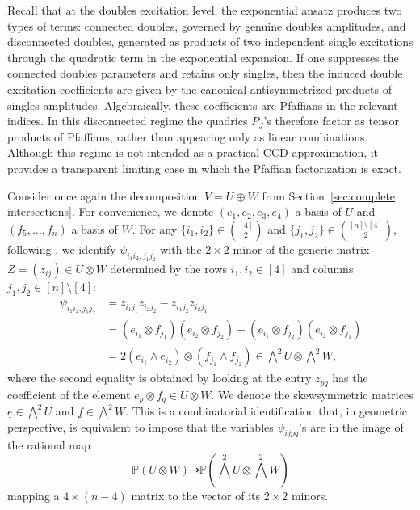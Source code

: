 \documentclass[11pt,reqno]{amsart}
\theoremstyle{definition}
\numberwithin{theorem}{section}
\numberwithin{equation}{section}
\begin{document}
Recall that at the doubles excitation level, the exponential ansatz produces two types of terms: connected doubles, governed by genuine doubles amplitudes, and disconnected doubles, generated as products of two independent single excitations through the quadratic term in the exponential expansion. If one suppresses the connected doubles parameters and retains only singles, then the induced double excitation coefficients are given by the canonical antisymmetrized products of singles amplitudes. Algebraically, these coefficients are Pfaffians in the relevant indices. In this disconnected regime the quadrics $P_J$'s therefore factor as tensor products of Pfaffians, rather than appearing only as linear combinations. Although this regime is not intended as a practical CCD approximation, it provides a transparent limiting case in which the Pfaffian factorization is exact.

Consider once again the decomposition $V = U \oplus W$ from Section~\ref{sec:complete intersections}. For convenience, we denote $(e_1,e_2,e_3, e_4)$ a basis of $U$ and $(f_5,\ldots , f_n)$ a basis of $W$.
\noindent For any $\{i_1,i_2\}\in \binom{[4]}{2}$ and $\{j_1,j_2\}\in \binom{[n]\setminus [4]}{2}$, following \cite[Sec.\ 2.7.2]{landsberg2011tensors}, we identify $\psi_{i_1i_2,j_1j_2}$ with the $2\times 2$ minor of the generic matrix $Z=(z_{ij}) \in U\otimes W$ determined by the rows $i_1,i_2\in [4]$ and columns $j_1,j_2\in [n]\setminus [4]$:
\begin{align}\label{eq:t's as minors}
\psi_{i_1i_2,j_1j_2} & = z_{i_1j_1}z_{i_2j_2} - z_{i_1j_2}z_{i_2j_1} \nonumber \\
& = (e_{i_1}\otimes f_{j_1})(e_{i_2}\otimes f_{j_2}) - (e_{i_1}\otimes f_{j_2})(e_{i_2}\otimes f_{j_1}) \nonumber \\
& = 2(e_{i_1}\wedge e_{i_2})\otimes (f_{j_1}\wedge f_{j_2})  \in \textstyle{\bigwedge^2}U \otimes \textstyle{\bigwedge^2}W,
\end{align}
where the second equality is obtained by looking at the entry $z_{pq}$ has the coefficient of the element $e_p\otimes f_q \in U\otimes W$. We denote the skewsymmetric matrices $\underline{e} \in \bigwedge^2U$ and $\underline{f}\in \bigwedge^2W$. This is a combinatorial identification that, in geometric perspective, is equivalent to impose that the variables $\psi_{ijpq}$'s are in the image of the rational map 
\[ \mathbb P(U \otimes W)\dashrightarrow \mathbb P\left(\textstyle{\bigwedge^2U \otimes \bigwedge^2W}\right)\]
mapping a $4\times(n-4)$ matrix to the vector of its $2\times 2$ minors. 
\end{document}
